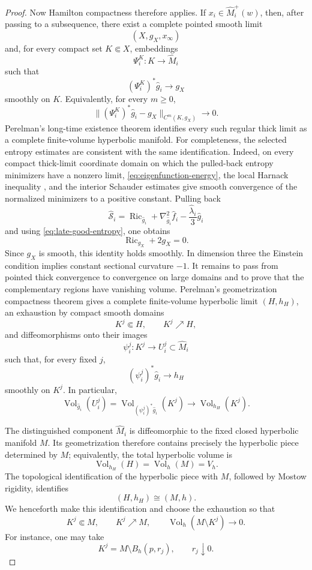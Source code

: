 \documentclass{amsart}
\begin{document}
\begin{proof}
\noindent Now Hamilton compactness therefore applies. If
\(x_i\in\widehat M_i^+(w)\), then, after passing to a subsequence, there
exist a complete pointed smooth limit
\[
        (X,g_X,x_\infty)
\]
and, for every compact set \(K\Subset X\), embeddings
\[
        \Psi_i^K:K\longrightarrow\widehat M_i
\]
such that
\[
        (\Psi_i^K)^*\widehat g_i
        \longrightarrow g_X
\]
smoothly on \(K\). Equivalently, for every \(m\geq0\),
\[
        \|(\Psi_i^K)^*\widehat g_i-g_X\|_{C^m(K,g_X)}
        \longrightarrow0.
\]
\noindent Perelman's long-time existence theorem identifies every such
regular thick limit as a complete finite-volume hyperbolic manifold.
For completeness, the selected entropy estimates are consistent with
the same identification. Indeed, on every compact thick-limit
coordinate domain on which the pulled-back entropy minimizers have a
nonzero limit, \eqref{eq:eigenfunction-energy}, the local Harnack
inequality \cite{yau1994harnack}, and the interior Schauder estimates give smooth convergence
of the normalized minimizers to a positive constant. Pulling back
\[
        \widehat{\mathcal S}_i
        =
        \operatorname{Ric}_{\widehat g_i}
        +
        \nabla^2_{\widehat g_i}\widehat f_i
        -
        \frac{\widehat\lambda_i}{3}\widehat g_i
\]
and using \eqref{eq:late-good-entropy}, one obtains
\[
        \operatorname{Ric}_{g_X}+2g_X=0.
\]
Since \(g_X\) is smooth, this identity holds smoothly. In dimension
three the Einstein condition implies constant sectional curvature
\(-1\).
\noindent
It remains to pass from pointed thick convergence to convergence on
large domains and to prove that the complementary regions have
vanishing volume. Perelman's geometrization compactness theorem gives
a complete finite-volume hyperbolic limit \((H,h_H)\), an exhaustion
by compact smooth domains
\[
        K^j\Subset H,
        \qquad
        K^j\nearrow H,
\]
and diffeomorphisms onto their images
\[
        \psi_i^j:K^j\longrightarrow U_i^j\subset\widehat M_i
\]
such that, for every fixed \(j\),
\[
        (\psi_i^j)^*\widehat g_i
        \longrightarrow h_H
\]
smoothly on \(K^j\). In particular,
\[
        \operatorname{Vol}_{\widehat g_i}(U_i^j)
        =
        \operatorname{Vol}_{(\psi_i^j)^*\widehat g_i}(K^j)
        \longrightarrow
        \operatorname{Vol}_{h_H}(K^j).
\]

\noindent The distinguished component \(\widehat M_i\) is diffeomorphic to the
fixed closed hyperbolic manifold \(M\). Its geometrization therefore
contains precisely the hyperbolic piece determined by \(M\); equivalently,
the total hyperbolic volume is
\[
        \operatorname{Vol}_{h_H}(H)
       =
        \operatorname{Vol}_h(M)
        =
        V_h.
\]
The topological identification of the hyperbolic piece with \(M\),
followed by Mostow rigidity, identifies
\[
        (H,h_H)
        \cong
        (M,h).
\]
We henceforth make this identification and choose the exhaustion so
that
\[
        K^j\Subset M,
        \qquad
        K^j\nearrow M,
        \qquad
        \operatorname{Vol}_h(M\setminus K^j)\longrightarrow0.
\]
For instance, one may take
\[
        K^j=M\setminus B_h(p,r_j),
        \qquad
        r_j\downarrow0.
\]


\end{proof}
\end{document}
